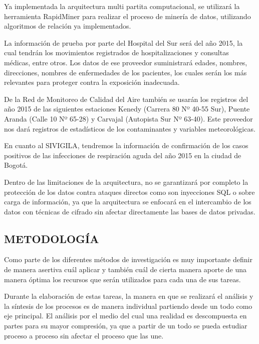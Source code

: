 \documentclass[a4paper, 12pt, oneside]{article}
\theoremstyle{definition}
\theoremstyle{remark}
\begin{document}
Ya implementada la arquitectura multi partita computacional, se utilizará la herramienta RapidMiner para realizar el proceso de minería de datos, utilizando algoritmos de relación ya implementados.

La información de prueba por parte del Hospital del Sur será del año 2015, la cual tendrán los movimientos registrados de hospitalizaciones y consultas médicas, entre otros. Los datos de ese proveedor suministrará edades, nombres, direcciones, nombres de enfermedades de los pacientes, los cuales serán los más relevantes para proteger contra la exposición inadecuada.

De la Red de Monitoreo de Calidad del Aire también se usarán los registros del año 2015 de las siguientes estaciones Kenedy (Carrera 80 Nº 40-55 Sur), Puente Aranda (Calle 10 Nº 65-28) y Carvajal (Autopista Sur Nº 63-40). Este proveedor nos dará registros de estadísticos de los contaminantes y variables meteorológicas.

En cuanto al SIVIGILA, tendremos la información de confirmación de los casos positivos de las infecciones de respiración aguda del año 2015 en la ciudad de Bogotá.

Dentro de las limitaciones de la arquitectura, no se garantizará por completo la protección de los datos contra ataques directos como son inyecciones SQL o sobre carga de información, ya que la arquitectura se enfocará en el intercambio de los datos con técnicas de cifrado sin afectar directamente las bases de datos privadas. 


\begin{center}
\section{METODOLOGÍA}

\end{center}
Como parte de los diferentes métodos de investigación es muy importante definir de manera asertiva cuál aplicar y también cuál de cierta manera aporte de una manera óptima los recursos que serán utilizados para cada una de sus tareas.

Durante la elaboración de estas tareas, la manera en que se realizará el análisis y la síntesis de los procesos es de manera individual partiendo desde un todo  como eje principal. El análisis por el medio del cual una realidad es descompuesta en partes para su mayor compresión, ya que a partir de un todo se pueda estudiar proceso a proceso sin afectar el proceso que las une. 
\end{document}
